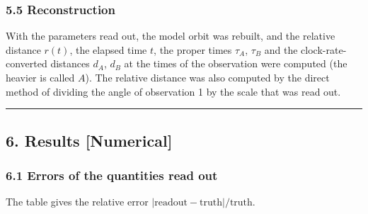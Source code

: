 \documentclass[
  a4paper,
]{article}
\begin{document}
\subsubsection{5.5 Reconstruction}\label{reconstruction}

With the parameters read out, the model orbit was rebuilt, and the
relative distance \(r(t)\), the elapsed time \(t\), the proper times
\(\tau_A\), \(\tau_B\) and the clock-rate-converted distances \(d_A\),
\(d_B\) at the times of the observation were computed (the heavier is
called \(A\)). The relative distance was also computed by the direct
method of dividing the angle of observation 1 by the scale that was read
out.

\begin{center}\rule{0.5\linewidth}{0.5pt}\end{center}

\subsection{6. Results {[}Numerical{]}}\label{results-numerical}

\subsubsection{6.1 Errors of the quantities read
out}\label{errors-of-the-quantities-read-out}

The table gives the relative error
\(|\text{readout}-\text{truth}|/\text{truth}\).
\end{document}
